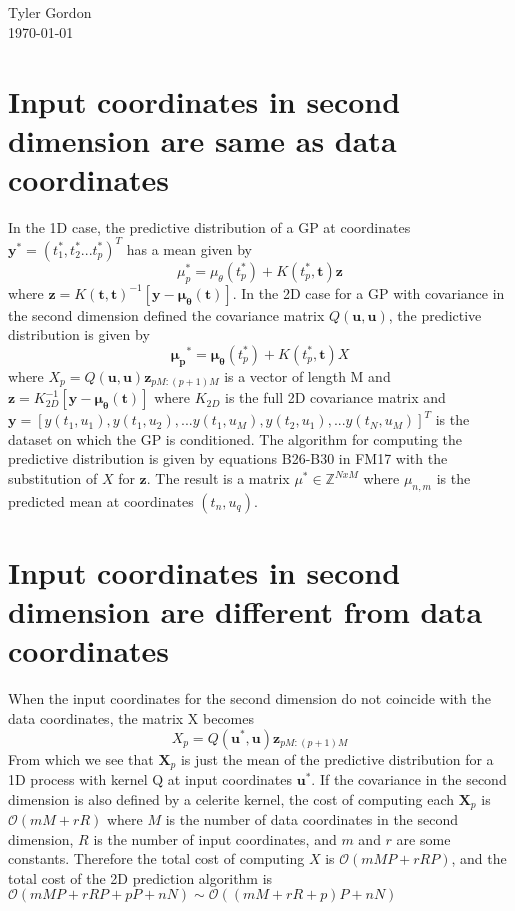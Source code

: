 \documentclass[a4paper, 11pt]{article}
\newcommand{\mytitle}{}
\begin{document}
\noindent
\large\textbf{\mytitle} \\ \\ Tyler Gordon \\
\normalsize \today 
\ \ \hrulefill
\section{Input coordinates in second dimension are same as data coordinates}
In the 1D case, the predictive distribution of a GP at coordinates $\bm{y^*} = (t^*_1, t^*_2... t^*_p)^T$ has a mean given by 
\begin{equation}
	\mu_p^* = \mu_\theta(t_p^*) + K(t_p^*, \bm{t})\bm{z}
\end{equation}
where $\bm{z} = K(\bm{t}, \bm{t})^{-1}[\bm{y} - \bm{\mu_\theta}(\bm{t})]$. In the 2D case for a GP with covariance in the second dimension 
defined the covariance matrix $Q(\bm{u},\bm{u})$, the predictive distribution is given by 
\begin{equation}
	\bm{\mu_p}^* = \bm{\mu_\theta}(t_p^*) + K(t_p^*, \bm{t})X
\end{equation}
where $X_p = Q(\bm{u}, \bm{u})\bm{z}_{pM:(p+1)M}$ is a vector of length M and 
$\bm{z} = K_{2D}^{-1}[\bm{y} - \bm{\mu_\theta}(\bm{t})]$ where $K_{2D}$ is the full 
2D covariance matrix and $\bm{y} = [y(t_1, u_1), y(t_1, u_2), ...y(t_1, u_M), y(t_2, u_1), ...y(t_N, u_M)]^T$ is the dataset on which 
the GP is conditioned. The algorithm for computing the predictive distribution is given by equations B26-B30 in FM17 with the 
substitution of $X$ for $\bm{z}$. The result is a matrix $\mu^* \in \mathbb{Z}^{N x M}$ where $\mu_{n, m}$ is the predicted mean 
at coordinates $(t_n, u_q)$. 
\section{Input coordinates in second dimension are different from data coordinates}
When the input coordinates for the second dimension do not coincide with the data coordinates, the matrix X becomes 
\begin{equation}
	X_p = Q(\bm{u}^*,\bm{u})\bm{z}_{pM:(p+1)M}
\end{equation}
From which we see that $\bm{X}_p$ is just the mean of the predictive distribution for a 1D process with kernel Q at input coordinates $\bm{u}^*$. 
If the covariance in the second dimension is also defined by a celerite kernel, the cost of computing each $\bm{X}_p$ is  
$\mathcal{O}(mM + rR)$ where $M$ is the number of data coordinates in the second dimension, $R$ is the number of 
input coordinates, and $m$ and $r$ are some constants. Therefore the total cost of computing $X$ is $\mathcal{O}(mMP + rRP)$, 
and the total cost of the 2D prediction algorithm is $\mathcal{O}(mMP + rRP + pP + nN) \sim \mathcal{O}((mM+rR+p)P + nN)$
\end{document}
